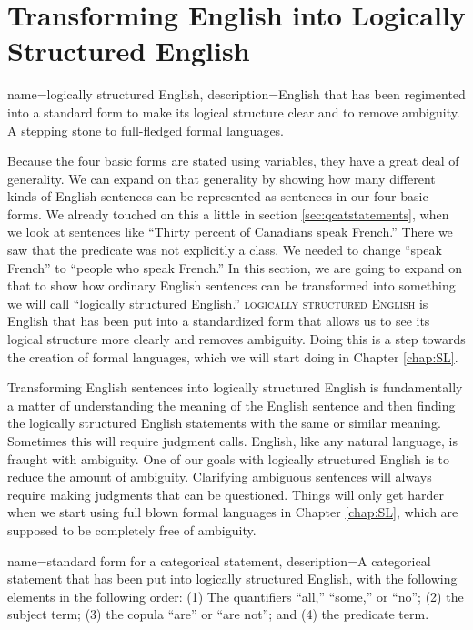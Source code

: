 \section{Transforming English into Logically Structured English} \label{sec:transformation}

{
name=logically structured English,
description={English that has been regimented into a standard form to make its logical structure clear and to remove ambiguity. A stepping stone to full-fledged formal languages.}
}

Because the four basic forms are stated using variables, they have a great deal of generality. We can expand on that generality by showing how many different kinds of English sentences can be represented as sentences in our four basic forms. We already touched on this a little in section \ref{sec:qcatstatements}, when we look at sentences like ``Thirty percent of Canadians speak French.'' There we saw that the predicate was not explicitly a class. We needed to change ``speak French'' to ``people who speak French.'' In this section, we are going to expand on that to show how ordinary English sentences can be transformed into something we will call ``logically structured English.'' \textsc{\gls{logically structured English}} \label{def:LSE} is English that has been put into a standardized form that allows us to see its logical structure more clearly and removes ambiguity.  Doing this is a step towards the creation of formal languages, which we will start doing in Chapter \ref{chap:SL}.

Transforming English sentences into logically structured English is fundamentally a matter of understanding the meaning of the English sentence and then finding the logically structured English statements with the same or similar meaning. Sometimes this will require judgment calls. English, like any natural  language, is fraught with ambiguity. One of our goals with logically structured English is to reduce the amount of ambiguity. Clarifying ambiguous sentences will always require making judgments that can be questioned. Things will only get harder when we start using full blown formal languages in Chapter \ref{chap:SL}, which are supposed to be completely free of ambiguity.

{
name=standard form for a categorical statement,
description={A categorical statement that has been put into logically structured English, with the following elements in the following order: (1) The quantifiers ``all,'' ``some,'' or ``no''; (2) the subject term; (3) the copula ``are'' or ``are not''; and (4) the predicate term.}
}


